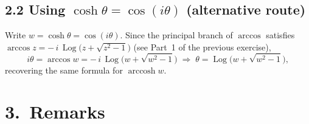 \documentclass[12pt]{article}
\DeclareMathOperator{\Log}{Log}
\theoremstyle{definition} %
\theoremstyle{plain} %
\begin{document}
\subsection*{2.2  Using $\cosh\theta=\cos(i\theta)$ (alternative route)}

Write \(w=\cosh\theta=\cos(i\theta)\).
Since the principal branch of \(\arccos\) satisfies
\(\arccos z=-\,i\,\Log\!\bigl(z+\sqrt{z^{2}-1}\bigr)\)
(see Part~1 of the previous exercise),
\[
i\theta
  =\arccos w
  =-\,i\,\Log\!\bigl(w+\sqrt{w^{2}-1}\bigr)
  \;\Longrightarrow\;
\theta
  =\Log\!\bigl(w+\sqrt{w^{2}-1}\bigr),
\]
recovering the same formula for $\operatorname{arccosh}w$.

\bigskip

\section*{3.\,  Remarks}
\end{document}
